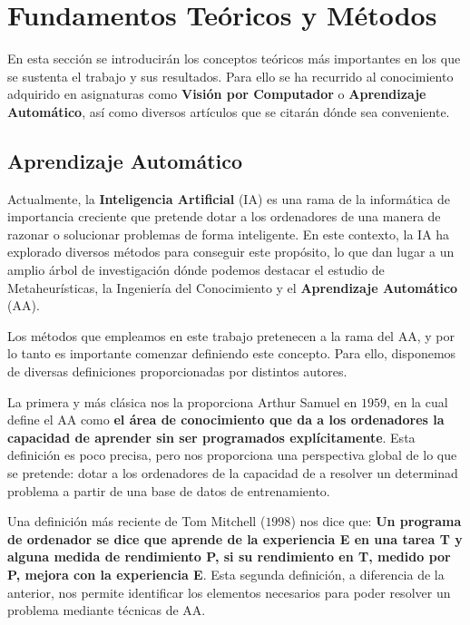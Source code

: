
\chapter{Fundamentos Teóricos y Métodos}

En esta sección se introducirán los conceptos teóricos más importantes en los que se sustenta el trabajo y sus resultados. Para ello se ha recurrido al conocimiento adquirido en asignaturas como \textbf{Visión por Computador} o \textbf{Aprendizaje Automático}, así como diversos artículos que se citarán dónde sea conveniente.

\section{Aprendizaje Automático}
    \noindent Actualmente, la \textbf{Inteligencia Artificial} (IA) es una rama de la informática de importancia creciente que pretende dotar a los ordenadores de una manera de razonar o solucionar problemas de forma inteligente. En este contexto, la IA ha explorado diversos métodos para conseguir este propósito, lo que dan lugar a un amplio árbol de investigación dónde podemos destacar el estudio de Metaheurísticas, la Ingeniería del Conocimiento y el \textbf{Aprendizaje Automático} (AA). 
    
    \medskip

    \noindent Los métodos que empleamos en este trabajo pretenecen a la rama del AA, y por lo tanto es importante comenzar definiendo este concepto. Para ello, disponemos de diversas definiciones proporcionadas por distintos autores.

    \medskip
    
    \noindent La primera y más clásica nos la proporciona Arthur Samuel en $1959$, en la cual define el AA como \textbf{el área de conocimiento que da a los ordenadores la capacidad de aprender sin ser programados explícitamente}. Esta definición es poco precisa, pero nos proporciona una perspectiva global de lo que se pretende: dotar a los ordenadores de la capacidad de  a resolver un determinad problema a partir de una base de datos de entrenamiento.
    
    \medskip
    
    \noindent Una definición más reciente de Tom Mitchell ($1998$) nos dice que: \textbf{Un programa de ordenador se dice que aprende de la experiencia E en una tarea T y alguna medida de rendimiento P, si su rendimiento en T, medido por P, mejora con la experiencia E}. Esta segunda definición, a diferencia de la anterior, nos permite identificar los elementos necesarios para poder resolver un problema mediante técnicas de AA.

